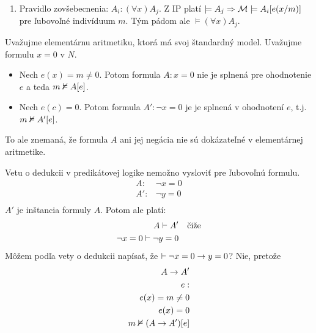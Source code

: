 \begin{dokaz}
\begin{enumerate}
\begin{enumerate}
        \item Pravidlo zovšebecnenia: $A_i: (\forall x) A_j$.
            Z IP platí $\models A_j \Rightarrow
                \mathcal{M} \models A_i[e(x/m)]$
            pre ľubovoľné indivíduum $m$. Tým pádom ale
            $\models (\forall x) A_j$.
            
        \end{enumerate}
    \end{enumerate}
\end{dokaz}

\startFIXME

\begin{priklad} %
    Uvažujme elementárnu aritmetiku, ktorá má svoj štandardný
    model. Uvažujme formulu $x=0$ v $N$.
    \begin{itemize}
        \item Nech $e(x) = m \neq 0$. Potom formula $A: x=0$ nie je
        splnená pre ohodnotenie $e$ a teda $m \nvDash A[e]$.
        \item Nech $e(c) = 0$. Potom formula $A': \neg x=0$ je je
        splnená v ohodnotení $e$, t.j. $m \nvDash A'[e]$.
    \end{itemize}
    To ale znemaná, že formula $A$ ani jej negácia
    nie sú dokázateľné v elementárnej aritmetike.
\end{priklad}


\begin{poznamka} %
    Vetu o dedukcii v predikátovej logike nemožno vysloviť pre
    ľubovoľnú formulu.
    \begin{align*}
            A: & \neg x=0 \\
            A': & \neg y=0 \\
    \end{align*}
    $A'$ je inštancia formuly $A$. Potom ale platí:
    \begin{align*}
            A \vdash A' & \quad \mbox{čiže}\\
            \neg x=0 \vdash \neg y=0
    \end{align*}
    Môžem podľa vety o dedukcii napísať, že 
    $\vdash \neg x=0 \rightarrow y=0$? Nie, pretože
    \begin{align*}
        A \rightarrow A' \\
        e: \\
        e(x)= m \neq 0 \\
        e(x)= 0 \\
        m \nvDash (A \rightarrow A')[e]
    \end{align*}
\end{poznamka}

